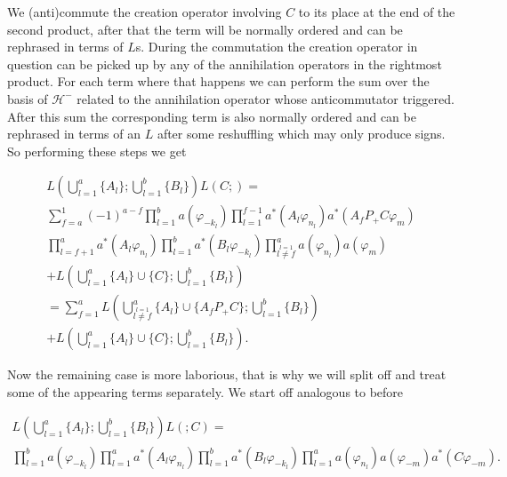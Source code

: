 \documentclass[b5paper,draft,openbib,12pt]{memoir}
\begin{document}
We (anti)commute the creation operator involving \(C\) to its place at the end of the second product, after that the term
will be normally ordered and can be rephrased in terms of \(L\)s. During the commutation the creation operator
in question can be picked up by any of the annihilation operators in the rightmost product. For each term where that happens
we can perform the sum over the basis of \(\mathcal{H}^-\) related to the annihilation operator whose anticommutator triggered.
After this sum the corresponding term is also normally ordered and can be rephrased in terms of an \(L\) after some 
reshuffling which may only produce signs. So performing these steps we get

\begin{multline}
L\left(\bigcup_{l=1}^a \{A_l\}; \bigcup_{l=1}^b \{B_l\}\right) L(C;)=\\
\sum_{f=a}^1 (-1)^{a-f} \prod_{l=1}^b a(\varphi_{-k_l}) \prod_{l=1}^{f-1} a^*(A_l \varphi_{n_l}) a^*(A_fP_+C\varphi_m)\\
 \prod_{l=f+1}^a a^*(A_l \varphi_{n_l}) \prod_{l=1}^b a^*(B_l \varphi_{-k_l}) \prod_{\stackrel{l=1}{l\neq f}}^a a(\varphi_{n_l}) a(\varphi_m)\\
+ L\left(\bigcup_{l=1}^a \{A_l\} \cup \{C\}; \bigcup_{l=1}^b \{B_l\}\right)\\
=\sum_{f=1}^a  L\left(\bigcup_{\stackrel{l=1}{l \neq f}}^a \{A_l\} \cup \{A_f P_+ C\}; \bigcup_{l=1}^b \{B_l\}\right)\\
+ L\left(\bigcup_{l=1}^a \{A_l\} \cup \{C\}; \bigcup_{l=1}^b \{B_l\}\right).
\end{multline}

Now the remaining case is more laborious, that is why we will split off and treat some of the appearing terms separately. 
We start off analogous to before 

\begin{multline}
L\left(\bigcup_{l=1}^a \{A_l\}; \bigcup_{l=1}^b \{B_l\}\right) L(;C)=\\
\prod_{l=1}^b a(\varphi_{-k_l}) \prod_{l=1}^a a^*(A_l \varphi_{n_l}) \prod_{l=1}^b a^*(B_l \varphi_{-k_l}) \prod_{l=1}^a a(\varphi_{n_l})a(\varphi_{-m}) a^*(C \varphi_{-m}).
\end{multline}
\end{document}
